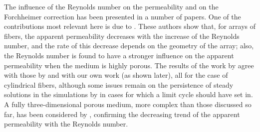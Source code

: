 The influence of the Reynolds number on the permeability and on the Forchheimer correction has been presented in a number of papers.
One of the contributions most relevant here is due to \citet{edwards1990}. These authors show that, for arrays of fibers, the apparent permeability decreases with the increase of the Reynolds number, and the rate of this decrease depends on the geometry of the array;
also, the Reynolds number is found to have a stronger influence on the apparent permeability when the medium is highly porous.
The results of the work by \citet{edwards1990} agree with those by \citet{zampogna} and with our own work (as shown later), all for
the case of cylindrical fibers, although some issues remain on the persistence of steady solutions in the simulations by \citet{edwards1990} 
in cases for which a limit cycle should have set in. A fully three-dimensional porous medium, more complex than those discussed so far, 
has been considered by \citet{soulaine2014}, confirming the decreasing trend of the apparent permeability with the Reynolds number. 

